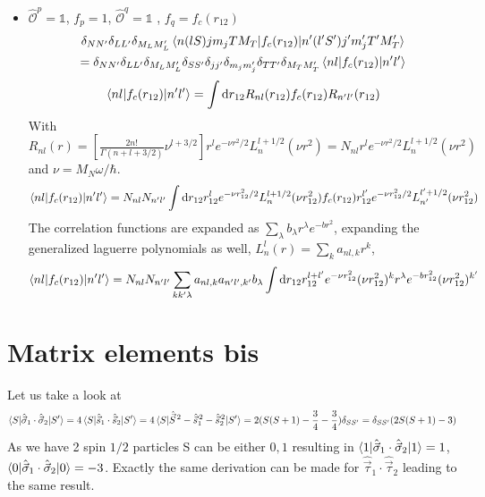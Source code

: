 \documentclass[10pt]{article}
\begin{document}
\begin{itemize}
	\item $\hat{\mathcal{O}}^{p} = \mathbb{1}$, $f_{p} = 1$, $\hat{\mathcal{O}}^{q} = \mathbb{1}$ , $f_{q} = f_c(r_{12})$ 
	\begin{multline*}
		\delta_{NN'} \delta_{LL'} \delta_{M_L M_L'} \braket{ n (l S) j m_j T M_T |  f_{c}(r_{12}) | n' (l' S') j' m_j' T' M_T'}  \\
		= \delta_{NN'} \delta_{LL'} \delta_{M_L M_L'} \delta_{SS'} \delta_{jj'} \delta_{m_j m_j'} \delta_{TT'} \delta_{M_T M_T'} \braket{ n l |  f_{c}(r_{12}) | n' l'} 
	\end{multline*}
	\begin{multline*}
		\braket{ n l |  f_{c}(r_{12}) | n' l'} = \int \text{d} r_{12} R_{nl}(r_{12}) f_{c}(r_{12}) R_{n'l'}(r_{12}) \\
	\end{multline*}
	With  $R_{nl}(r) = \left[ \frac{2n!}{\Gamma(n + l + 3/2)} \nu^{l + 3/2} \right] r^{l} e^{-\nu r^{2} /2} L_{n}^{l+1/2}(\nu r^{2}) = N_{nl} r^{l} e^{-\nu r^{2} /2} L_{n}^{l+1/2}(\nu r^{2})$ and $ \nu = M_N \omega / \hbar $.
	\begin{multline*}
		\braket{ n l |  f_{c}(r_{12}) | n' l'} = N_{nl} N_{n'l'} \int \text{d} r_{12} r_{12}^{l} e^{-\nu r_{12}^{2} /2} L_{n}^{l+1/2}(\nu r_{12}^{2}) f_{c}(r_{12}) r_{12}^{l'} e^{-\nu r_{12}^{2} /2} L_{n'}^{l'+1/2}(\nu r_{12}^{2}) \\
	\end{multline*}
	The correlation functions are expanded as $ \sum_{\lambda} b_{\lambda} r^{\lambda} e^{-b r^{2}}$, expanding the generalized laguerre polynomials as well, $ L_{n}^{l}(r) = \sum_{k} a_{nl,k} r^{k}$,
	\begin{multline*}
		\braket{ n l |  f_{c}(r_{12}) | n' l'} = N_{nl} N_{n'l'} \sum_{kk'\lambda} a_{nl,k} a_{n'l',k'} b_{\lambda}  \int \text{d} r_{12} r_{12}^{l+l'} e^{-\nu r_{12}^{2}} ( \nu r_{12}^{2} )^{k} r^{\lambda} e^{-b r_{12}^{2}} ( \nu r_{12}^{2})^{k'}
	\end{multline*}
\end{itemize}
\section{Matrix elements bis}

Let us take a look at
\begin{align*}
	\braket{ S | \hat{ \vec{\sigma}}_{1} \cdot \hat{ \vec{\sigma}}_{2} | S'} = 4 \braket{ S | \hat{ \vec{s}}_{1} \cdot \hat{ \vec{s}}_{2} | S'} = 4 \braket{ S | \hat{\vec{S}}^{\, 2} - \hat{\vec{s}}_{1}^{\,2} - \hat{\vec{s}}_{2}^{\,2} | S'} = 2 ( S(S+1) - \frac{3}{4} - \frac{3}{4} ) \delta_{SS'} = \delta_{SS'} (2 S(S+1) - 3)
\end{align*}
As we have 2 spin $1/2$ particles S can be either $0,1$ resulting in $\braket{ 1 | \hat{ \vec{\sigma}}_{1} \cdot \hat{ \vec{\sigma}}_{2} | 1} = 1$, $\braket{ 0 | \hat{ \vec{\sigma}}_{1} \cdot \hat{ \vec{\sigma}}_{2} | 0} = -3$.
Exactly the same derivation can be made for $\hat{\vec{\tau}}_{1} \cdot \hat{\vec{\tau}}_{2}$ leading to the same result.
\end{document}

